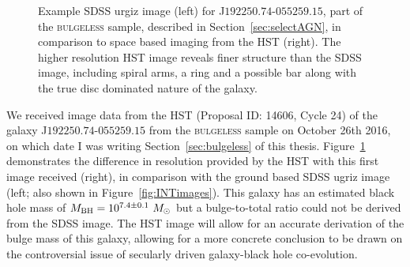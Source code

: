 \begin{figure}
\caption[Example HST image data in comparison to SDSS]{Example SDSS urgiz image (left) for J$192250.74$-$055259.15$, part of the \textsc{bulgeless} sample, described in Section~\ref{sec:selectAGN}, in comparison to space based imaging from the HST (right). The higher resolution HST image reveals finer structure than the SDSS image, including spiral arms, a ring and a possible bar along with the true disc dominated nature of the galaxy.}
\label{fig:hstdata}
\end{figure}

We received image data from the HST (Proposal ID: 14606, Cycle 24) of the galaxy J$192250.74$-$055259.15$ from the \textsc{bulgeless} sample on October 26th 2016, on which date I was writing Section~\ref{sec:bulgeless} of this thesis. Figure~\ref{fig:hstdata} demonstrates the difference in resolution provided by the HST with this first image received (right), in comparison with the ground based SDSS ugriz image (left; also shown in Figure~\ref{fig:INTimages}). This galaxy has an estimated black hole mass of $M_{\rm{BH}} = 10^{7.4\pm0.1}~M_{\odot}$ but a bulge-to-total ratio could not be derived from the SDSS image. The HST image will allow for an accurate derivation of the bulge mass of this galaxy, allowing for a more concrete conclusion to be drawn on the controversial issue of secularly driven galaxy-black hole co-evolution. 

